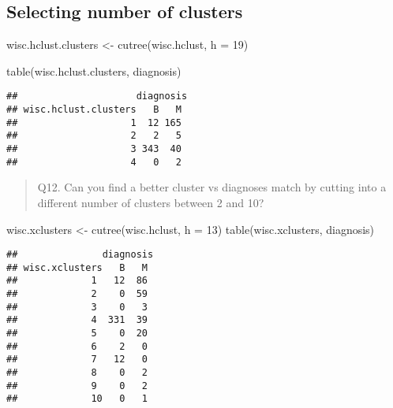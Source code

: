 \documentclass[
]{article}
\newenvironment{Shaded}{\begin{snugshade}}{\end{snugshade}}
\newcommand{\AttributeTok}[1]{\textcolor[rgb]{0.77,0.63,0.00}{#1}}
\newcommand{\DecValTok}[1]{\textcolor[rgb]{0.00,0.00,0.81}{#1}}
\newcommand{\FunctionTok}[1]{\textcolor[rgb]{0.00,0.00,0.00}{#1}}
\newcommand{\NormalTok}[1]{#1}
\newcommand{\OtherTok}[1]{\textcolor[rgb]{0.56,0.35,0.01}{#1}}
\begin{document}
\hypertarget{selecting-number-of-clusters}{%
\subsection{Selecting number of
clusters}\label{selecting-number-of-clusters}}

\begin{Shaded}
\begin{Highlighting}[]
\NormalTok{wisc.hclust.clusters }\OtherTok{\textless{}{-}} \FunctionTok{cutree}\NormalTok{(wisc.hclust, }\AttributeTok{h =} \DecValTok{19}\NormalTok{)}
\end{Highlighting}
\end{Shaded}

\begin{Shaded}
\begin{Highlighting}[]
\FunctionTok{table}\NormalTok{(wisc.hclust.clusters, diagnosis)}
\end{Highlighting}
\end{Shaded}

\begin{verbatim}
##                     diagnosis
## wisc.hclust.clusters   B   M
##                    1  12 165
##                    2   2   5
##                    3 343  40
##                    4   0   2
\end{verbatim}

\begin{quote}
Q12. Can you find a better cluster vs diagnoses match by cutting into a
different number of clusters between 2 and 10?
\end{quote}

\begin{Shaded}
\begin{Highlighting}[]
\NormalTok{wisc.xclusters }\OtherTok{\textless{}{-}} \FunctionTok{cutree}\NormalTok{(wisc.hclust, }\AttributeTok{h =} \DecValTok{13}\NormalTok{)}
\FunctionTok{table}\NormalTok{(wisc.xclusters, diagnosis)}
\end{Highlighting}
\end{Shaded}

\begin{verbatim}
##               diagnosis
## wisc.xclusters   B   M
##             1   12  86
##             2    0  59
##             3    0   3
##             4  331  39
##             5    0  20
##             6    2   0
##             7   12   0
##             8    0   2
##             9    0   2
##             10   0   1
\end{verbatim}
\end{document}
